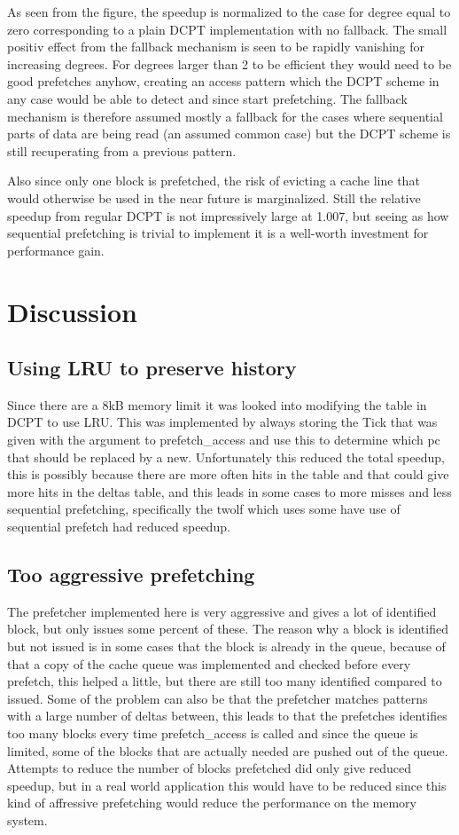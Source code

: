 \documentclass[12pt,journal,compsoc]{IEEEtran}
\begin{document}
As seen from the figure, the speedup is normalized to the case for degree equal
to zero corresponding to a plain DCPT implementation with no fallback. The
small positiv effect from the fallback mechanism is seen to be rapidly
vanishing for increasing degrees. For degrees larger than 2 to be efficient
they would need to be good prefetches anyhow, creating an access pattern which
the DCPT scheme in any case would be able to detect and since start
prefetching. The fallback mechanism is therefore assumed mostly a fallback for
the cases where sequential parts of data are being read
(an assumed common case) but the DCPT scheme is still recuperating from a
previous pattern.

Also since only one block is prefetched, the risk of evicting a cache line
that would otherwise be used in the near future is marginalized. Still the
relative speedup from regular DCPT is not impressively large at 1.007, but
seeing as how sequential prefetching is trivial to implement it is a
well-worth investment for performance gain.

\section{Discussion}
\subsection{Using LRU to preserve history}
Since there are a 8kB memory limit it was looked into modifying the table in DCPT to use LRU. This was implemented by always storing the Tick that was given with the argument to prefetch\_access and use this to determine which pc that should be replaced by a new. Unfortunately this reduced the total speedup, this is possibly because there are more often hits in the table and that could give more hits in the deltas table, and this leads in some cases to more misses and less sequential prefetching, specifically the twolf which uses some have use of sequential prefetch had reduced speedup.

\subsection{Too aggressive prefetching}
The prefetcher implemented here is very aggressive and gives a lot of identified block, but only issues some percent of these. The reason why a block is identified but not issued is in some cases that the block is already in the queue, because of that a copy of the cache queue was implemented and checked before every prefetch, this helped a little, but there are still too many identified compared to issued. Some of the problem can also be that the prefetcher matches patterns with a large number of deltas between, this leads to that the prefetches identifies too many blocks every time prefetch\_access is called and since the queue is limited, some of the blocks that are actually needed are pushed out of the queue. Attempts to reduce the number of blocks prefetched did only give reduced speedup, but in a real world application this would have to be reduced since this kind of affressive prefetching would reduce the performance on the memory system.
\end{document}
